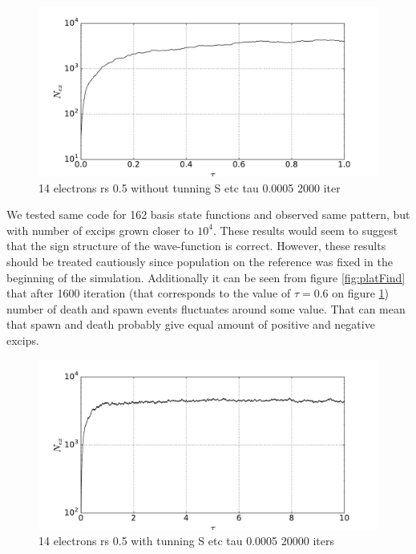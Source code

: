 \documentclass[twoside,english]{uiofysmaster}
\begin{document}
\begin{figure}[ht!]
	\centering
	\includegraphics[width=0.8\linewidth]{Nex2000new}
	\caption{14 electrons rs 0.5 without tunning S etc tau 0.0005 2000 iter }
	\label{fig:nx2k}
\end{figure}
We tested same code for 162 basis state functions and observed same pattern, but with number of excips grown closer to $10^4$. These results would seem to suggest that the sign structure of the wave-function is correct.
However, these results should be treated cautiously since population on the reference was fixed in the beginning of the simulation. Additionally it can be seen from figure \ref{fig:platFind} that after 1600 iteration (that corresponds to the value of $\tau=0.6$ on figure \ref{fig:nx2k}) number of death and spawn events fluctuates around some value. That can mean that spawn and death probably give equal amount of positive and negative excips.

	
	



\begin{figure}[ht!]
	\centering
	\includegraphics[width=0.8\linewidth]{Nex20000}
	\caption{14 electrons rs 0.5 with tunning S etc tau 0.0005 20000 iters}
	\label{fig:nx20k}
\end{figure}
\end{document}
